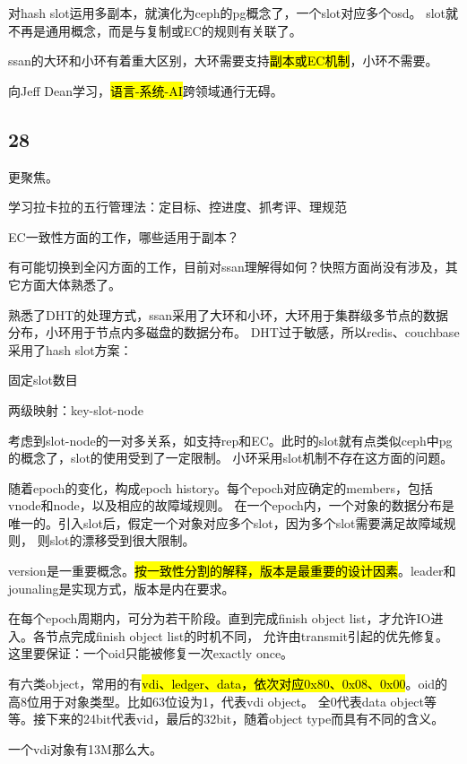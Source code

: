 对hash slot运用多副本，就演化为ceph的pg概念了，一个slot对应多个osd。
slot就不再是通用概念，而是与复制或EC的规则有关联了。

ssan的大环和小环有着重大区别，大环需要支持\hl{副本或EC机制}，小环不需要。

向Jeff Dean学习，\hl{语言-系统-AI}跨领域通行无碍。

\subsection{28}

更聚焦。

学习拉卡拉的五行管理法：定目标、控进度、抓考评、理规范

EC一致性方面的工作，哪些适用于副本？

有可能切换到全闪方面的工作，目前对ssan理解得如何？快照方面尚没有涉及，其它方面大体熟悉了。

熟悉了DHT的处理方式，ssan采用了大环和小环，大环用于集群级多节点的数据分布，小环用于节点内多磁盘的数据分布。
DHT过于敏感，所以redis、couchbase采用了hash slot方案：
\begin{enumbox}
\item 固定slot数目
\item 两级映射：key-slot-node
\end{enumbox}

考虑到slot-node的一对多关系，如支持rep和EC。此时的slot就有点类似ceph中pg的概念了，slot的使用受到了一定限制。
小环采用slot机制不存在这方面的问题。

随着epoch的变化，构成epoch history。每个epoch对应确定的members，包括vnode和node，以及相应的故障域规则。
在一个epoch内，一个对象的数据分布是唯一的。引入slot后，假定一个对象对应多个slot，因为多个slot需要满足故障域规则，
则slot的漂移受到很大限制。

version是一重要概念。\hl{按一致性分割的解释，版本是最重要的设计因素}。leader和jounaling是实现方式，版本是内在要求。

在每个epoch周期内，可分为若干阶段。直到完成finish object list，才允许IO进入。各节点完成finish object list的时机不同，
允许由transmit引起的优先修复。这里要保证：一个oid只能被修复一次exactly once。

\hrulefill

有六类object，常用的有\hl{vdi、ledger、data，依次对应0x80、0x08、0x00}。oid的高8位用于对象类型。比如63位设为1，代表vdi object。
全0代表data object等等。接下来的24bit代表vid，最后的32bit，随着object type而具有不同的含义。

一个vdi对象有13M那么大。

